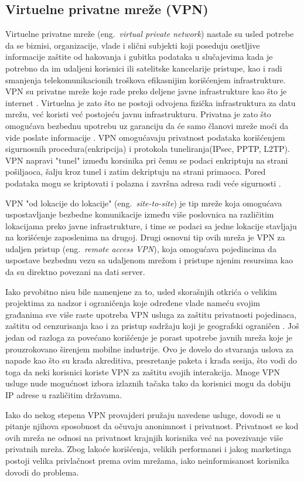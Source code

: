 \documentclass[a4paper]{article}
\begin{document}
\subsection{Virtuelne privatne mreže (VPN)}
Virtuelne privatne mreže (eng.~{\em virtual private network}) nastale su usled potrebe da se biznisi, organizacije, vlade i slični subjekti koji poseduju osetljive informacije zaštite od hakovanja i gubitka podataka u slučajevima kada je potrebno da im udaljeni korisnici ili satelitske kancelarije pristupe, kao i radi smanjenja telekomunikacionih troškova efikasnijim korišćenjem infrastrukture. VPN su privatne mreže koje rade preko deljene javne infrastrukture kao što je internet \cite{vpn2}. Virtuelna je zato što ne postoji odvojena fizička infrastruktura za datu mrežu, već koristi već postojeću javnu infrastrukturu. Privatna je zato što  omogućava bezbednu upotrebu uz garanciju da će samo članovi mreže moći da vide poslate informacije \cite{vpn3}. VPN omogućavaju privatnost podataka korišćenjem sigurnosnih procedura(enkripcija)  i  protokola tuneliranja(IPsec, PPTP, L2TP). VPN napravi "tunel"  između korsinika pri čemu se podaci enkriptuju na strani pošiljaoca, šalju kroz tunel i zatim dekriptuju na strani primaoca. Pored podataka mogu se kriptovati i polazna i završna adresa radi veće sigurnosti \cite{vpn4}. 
\par VPN "od lokacije do lokacije" (eng.~{\em site-to-site}) je tip mreže koja omogućava uspostavljanje bezbedne komunikacije između više poslovnica na različitim lokacijama preko javne infrastrukture, i time se podaci sa jedne lokacije stavljaju na korišćenje zaposlenima na drugoj. Drugi osnovni tip ovih mreža je VPN za udaljen pristup (eng.~{\em remote access VPN}), koja omogućava pojedincima da uspostave bezbednu vezu sa udaljenom mrežom i pristupe njenim resursima kao da su direktno povezani na dati server.
\par Iako prvobitno nisu bile namenjene za to, usled skorašnjih otkrića o velikim projektima za nadzor i ograničenja koje određene vlade nameću svojim građanima sve više raste upotreba VPN usluga za zaštitu privatnosti pojedinaca, zaštitu od cenzurisanja kao i za pristup sadržaju koji je geografski ograničen \cite{vpn5}. Još jedan od razloga za povećano korišćenje je  porast upotrebe javnih mreža koje je prouzrokovano širenjem mobilne industrije. Ovo je dovelo do stvaranja uslova za napade kao što su krađa akreditiva, presretanje paketa i krađa sesija, što vodi do toga da neki korisnici koriste VPN za zaštitu svojih interakcija. Mnoge VPN usluge nude mogućnost izbora izlaznih tačaka tako da korisnici mogu da dobiju IP adrese u različitim državama.
\par Iako do nekog stepena VPN provajderi pružaju navedene usluge, dovodi se u pitanje njihova sposobnost da očuvaju anonimnost i privatnost. Privatnost se kod ovih mreža ne odnosi na privatnost krajnjih korisnika već na povezivanje više privatnih mreža. Zbog lakoće korišćenja, velikih performansi i jakog marketinga postoji velika privlačnost prema ovim mrežama, iako neinformisanost korisnika dovodi do problema.
\end{document}
